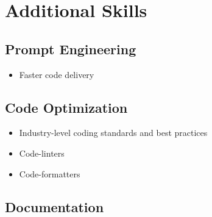 \documentclass[letterpaper]{deedy-resume} %
\begin{document}
\begin{minipage}[t]{0.33\textwidth} %





\section{Additional Skills}

\subsection{Prompt Engineering}

\begin{itemize}
\setlength\itemsep{-0.5em} %
\item Faster code delivery
\end{itemize}



\subsection{Code Optimization}

\begin{itemize}
\setlength\itemsep{-0.5em} %
\item Industry-level coding standards and best practices
\item Code-linters
\item Code-formatters
\end{itemize}

\subsection{Documentation}


\end{minipage}
\end{document}

